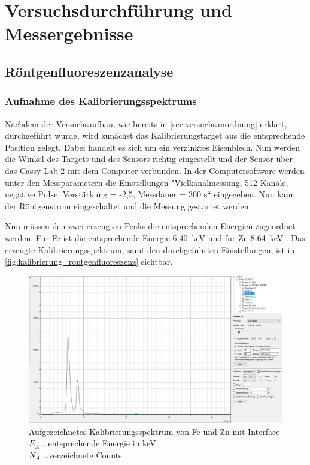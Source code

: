 \documentclass[12pt,english,ngerman]{scrartcl}
\begin{document}
\section{Versuchsdurchführung und Messergebnisse}\label{sec:versuchsdurchfuehrung_messergebnisse}

\subsection{Röntgenfluoreszenzanalyse}

\subsubsection{Aufnahme des Kalibrierungsspektrums}

Nachdem der Versuchsaufbau, wie bereits in \autoref{sec:versuchsanordnung} erklärt, durchgeführt wurde,
wird zunächst das Kalibrierungstarget aus die entsprechende Position gelegt. Dabei handelt es sich um 
ein verzinktes Eisenblech. Nun werden die Winkel des Targets und des Sensors richtig eingestellt und der
Sensor über das Cassy Lab 2 mit dem Computer verbunden.
In der Computersoftware werden unter den Messparametern die Einstellungen 
"Vielkanalmessung, 512 Kanäle, negative Pulse, Verstärkung = -2,5, Messdauer = 300 s“
eingegeben. Nun kann der Röntgenstrom eingeschaltet und die Messung gestartet werden.

Nun müssen den zwei erzeugten Peaks die entsprechenden Energien zugeordnet werden. 
Für Fe ist die entsprechende Energie \SI{6.40}{keV} und für Zn \SI{8.64}{keV} \cite{unterlagen_rontgenfluorenzenz}.
Das erzeugte Kalibrierungsspektrum, samt den durchgeführten Einstellungen, ist in \autoref{fig:kalibrierung_rontgenfluoreszenz} sichtbar.

\begin{figure}[H]
	\begin{center}
		\includegraphics[width =\textwidth]{./figures/roentgen/FeZnKalibrierung.PNG}
	\end{center}
	\caption[Aufgezeichnetes Kalibrierungsspektrum mit Interface]
	{\footnotesize Aufgezeichnetes Kalibrierungsspektrum von Fe und Zn mit Interface \\
	$E_A$ \dots entsprechende Energie in keV\\
	$N_A$ \dots verzeichnete Counts
	}\label{fig:kalibrierung_rontgenfluoreszenz}
\end{figure}
\end{document}
